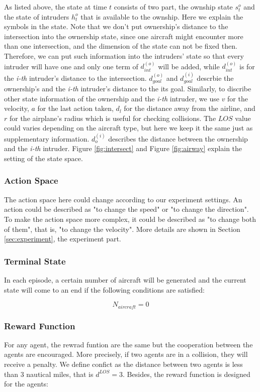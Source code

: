 As listed above, the state at time $t$ consists of two part, the ownship state $s_t^o$ and the state of intruders $h_t^o$ that is available to the ownship. Here we explain the symbols in the state. Note that we don't put ownership's distance to the intersection into the ownership state, since one aircraft might encounter more than one intersection, and the dimension of the state can not be fixed then. Therefore, we can put such information into the intruders' state so that every intruder will have one and only one term of $d_{int}^{(o)}$ will be added, while $d_{int}^{(o)}$ is for the \textit{i-th} intruder's distance to the intersection. $d_{goal}^{(o)}$ and $d_{goal}^{(i)}$ descrbie the ownership's and the \textit{i-th} intruder's distance to the its goal. Similarly, to discribe other state information of the ownership and the \textit{i-th} intruder, we use $v$ for the velocity, $a$ for the last action taken, $d_l$ for the distance away from the airline, and $r$ for the airplane's radius which is useful for checking collisions. The $LOS$ value could varies depending on the aircraft type, but here we keep it the same just as supplementary information. $d_o^{(i)}$ describes the distance between the ownership and the \textit{i-th} intruder. Figure \ref{fig:intersect} and Figure \ref{fig:airway} explain the setting of the state space.

\subsubsection{Action Space}
The action space here could change according to our experiment settings. An action could be described as "to change the speed" or "to change the direction". To make the action space more complex, it could be described as "to change both of them", that is, "to change the velocity". More details are shown in Section \ref{sec:experiment}, the experiment part.

\subsubsection{Terminal State}
In each episode, a certain number of aircraft will be generated and the current state will come to an end if the following conditions are satisfied:

\[{N_{aircraft}} = 0\]

\subsubsection{Reward Function}
For any agent, the rewrad funtion are the same but the cooperation between the agents are encouraged. More precisely, if two agents are in a collision, they will receive a penalty. We define confict as the distance between two agents is less than 3 nautical miles, that is ${d^{LOS}} = 3$. Besides, the reward function is designed for the agents:

